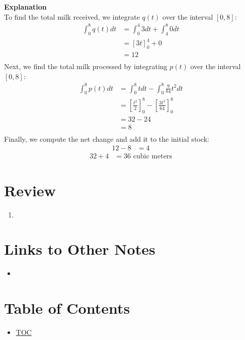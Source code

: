 \textbf{Explanation}\\
To find the total milk received, we integrate $q(t)$ over the interval $[0,8]$:
\begin{align*}
  \int_0^8 q(t) dt &= \int_0^4 3 dt + \int_4^8 0 dt\\
                   &= [3t]^4_0 + 0\\
                   &= 12\\
\end{align*}
Next, we find the total milk processed by integrating $p(t)$ over the interval $[0,8]$:
\begin{align*}
  \int_0^8 p(t) dt &= \int_0^8 t dt - \int_0^8 \frac{9}{64}t^2 dt\\
                   &= [\displaystyle\frac{t^2}{2}]^8_0 - [\displaystyle\frac{3t^3}{64}]^8_0\\
                   &= 32 - 24\\
                   &= 8\\
\end{align*}
Finally, we compute the net change and add it to the initial stock:
\begin{align*}
  12 - 8 &= 4
\end{align*}
\begin{align*}
  32 + 4 &= 36 \text{ cubic meters}
\end{align*}

\section*{Review}
\begin{enumerate}
  \item 
\end{enumerate}


\section*{Links to Other Notes}
\begin{itemize}
  \item \hyperref[]{}
\end{itemize}

\section*{Table of Contents}

\begin{itemize}
  \item \hyperref[toc]{TOC}
\end{itemize}

